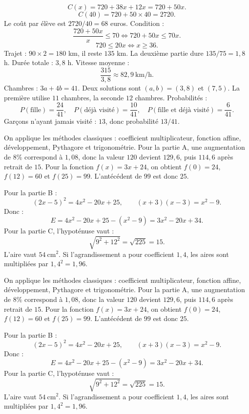 \documentclass[11pt,a4paper]{article}
\newcounter{correction}
\begin{document}
\begin{correction}[M-LONG-05]
\[
C(x)=720+38x+12x=720+50x.
\]
\[
C(40)=720+50\times40=2720.
\]
Le coût par élève est $2720/40=68$ euros. Condition :
\[
\frac{720+50x}{x}\leq70 \Longleftrightarrow 720+50x\leq70x.
\]
\[
720\leq20x \Longleftrightarrow x\geq36.
\]
Trajet : $90\times2=180$ km, il reste $135$ km. La deuxième partie dure $135/75=1{,}8$ h. Durée totale : $3{,}8$ h. Vitesse moyenne :
\[
\frac{315}{3{,}8}\approx82{,}9\ \mathrm{km/h}.
\]
Chambres : $3a+4b=41$. Deux solutions sont $(a,b)=(3,8)$ et $(7,5)$. La première utilise $11$ chambres, la seconde $12$ chambres. Probabilités :
\[
P(\text{fille})=\frac{24}{41},\quad P(\text{déjà visité})=\frac{10}{41},\quad P(\text{fille et déjà visité})=\frac{6}{41}.
\]
Garçons n'ayant jamais visité : $13$, donc probabilité $13/41$.
\end{correction}
\begin{correction}
On applique les méthodes classiques : coefficient multiplicateur, fonction affine, développement, Pythagore et trigonométrie. Pour la partie A, une augmentation de $8\%$ correspond à $1{,}08$, donc la valeur $120$ devient $129{,}6$, puis $114{,}6$ après retrait de $15$. Pour la fonction $f(x)=3x+24$, on obtient $f(0)=24$, $f(12)=60$ et $f(25)=99$. L'antécédent de $99$ est donc $25$.

Pour la partie B :
\[
(2x-5)^2=4x^2-20x+25,
\qquad
(x+3)(x-3)=x^2-9.
\]
Donc :
\[
E=4x^2-20x+25-(x^2-9)=3x^2-20x+34.
\]
Pour la partie C, l'hypoténuse vaut :
\[
\sqrt{9^2+12^2}=\sqrt{225}=15.
\]
L'aire vaut $54\ \mathrm{cm^2}$. Si l'agrandissement a pour coefficient $1{,}4$, les aires sont multipliées par $1{,}4^2=1{,}96$.
\end{correction}
\begin{correction}
On applique les méthodes classiques : coefficient multiplicateur, fonction affine, développement, Pythagore et trigonométrie. Pour la partie A, une augmentation de $8\%$ correspond à $1{,}08$, donc la valeur $120$ devient $129{,}6$, puis $114{,}6$ après retrait de $15$. Pour la fonction $f(x)=3x+24$, on obtient $f(0)=24$, $f(12)=60$ et $f(25)=99$. L'antécédent de $99$ est donc $25$.

Pour la partie B :
\[
(2x-5)^2=4x^2-20x+25,
\qquad
(x+3)(x-3)=x^2-9.
\]
Donc :
\[
E=4x^2-20x+25-(x^2-9)=3x^2-20x+34.
\]
Pour la partie C, l'hypoténuse vaut :
\[
\sqrt{9^2+12^2}=\sqrt{225}=15.
\]
L'aire vaut $54\ \mathrm{cm^2}$. Si l'agrandissement a pour coefficient $1{,}4$, les aires sont multipliées par $1{,}4^2=1{,}96$.
\end{correction}
\end{document}
